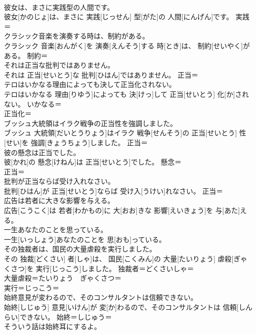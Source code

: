 \documentclass[8pt]{extreport}
\begin{document}
\begin{CJK}{UTF8}{min}
\\	彼女は、まさに実践型の人間です。	
\\	彼女[かのじょ]は、まさに 実践[じっせん] 型[がた]の 人間[にんげん]です。	実践＝ 
\\	クラシック音楽を演奏する時は、制約がある。	
\\	クラシック 音楽[おんがく]を 演奏[えんそう]する 時[とき]は、 制約[せいやく]がある。	制約＝ 
\\	それは正当な批判ではありません。	
\\	それは 正当[せいとう]な 批判[ひはん]ではありません。	正当＝ 
\\	テロはいかなる理由によっても決して正当化されない。	
\\	テロはいかなる 理由[りゆう]によっても 決[けっ]して 正当[せいとう] 化[か]されない。	いかなる＝ 
\\	正当化＝ 
\\	ブッシュ大統領はイラク戦争の正当性を強調しました。	
\\	ブッシュ 大統領[だいとうりょう]はイラク 戦争[せんそう]の 正当[せいとう] 性[せい]を 強調[きょうちょう]しました。	正当＝ 
\\	彼の懸念は正当でした。	
\\	彼[かれ]の 懸念[けねん]は 正当[せいとう]でした。	懸念＝ 
\\	正当＝ 
\\	批判が正当ならば受け入れなさい。	
\\	批判[ひはん]が 正当[せいとう]ならば 受け入[うけい]れなさい。	正当＝ 
\\	広告は若者に大きな影響を与える。	
\\	広告[こうこく]は 若者[わかもの]に 大[おお]きな 影響[えいきょう]を 与[あた]える。	
\\	一生あなたのことを思っている。	
\\	一生[いっしょう]あなたのことを 思[おも]っている。	
\\	その独裁者は、国民の大量虐殺を実行しました。	
\\	その 独裁[どくさい] 者[しゃ]は、 国民[こくみん]の 大量[たいりょう] 虐殺[ぎゃくさつ]を 実行[じっこう]しました。	独裁者＝どくさいしゃ＝ 
\\	大量虐殺＝たいりょう　ぎゃくさつ＝ 
\\	実行＝じっこう＝ 
\\	始終意見が変わるので、そのコンサルタントは信頼できない。	
\\	始終[しじゅう] 意見[いけん]が 変[か]わるので、そのコンサルタントは 信頼[しんらい]できない。	始終＝しじゅう＝ 
\\	そういう話は始終耳にするよ。	

\end{CJK}
\end{document}
